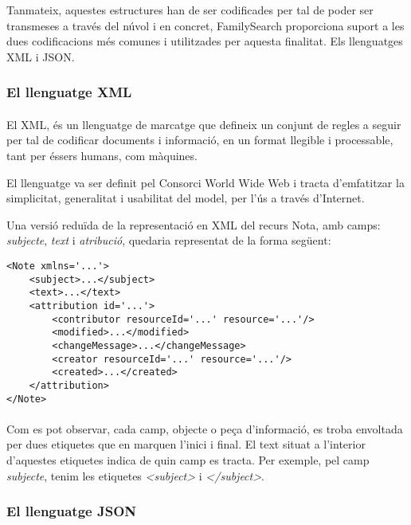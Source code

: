         Tanmateix, aquestes estructures han de ser codificades per tal de poder ser transmeses a través del núvol i en concret, FamilySearch proporciona suport a les dues codificacions més comunes i utilitzades per aquesta finalitat. Els llenguatges XML i JSON.


        \subsubsection{El llenguatge XML}

        \paragraph{}
        El \gls{XML}, és un llenguatge de marcatge que defineix un conjunt de regles a seguir per tal de codificar documents i informació, en un format llegible i processable, tant per éssers humans, com màquines.

        El llenguatge va ser definit pel Consorci World Wide Web i tracta d’emfatitzar la simplicitat, generalitat i usabilitat del model, per l'ús a través d'Internet.

        Una versió reduïda de la representació en XML del recurs Nota, amb camps: \emph{subjecte}, \emph{text} i \emph{atribució}, quedaria representat de la forma següent:

        \begin{lstlisting}[style=rawOwn,caption={Representació bàsica en XML d'una Nota}]
<Note xmlns='...'>
    <subject>...</subject>
    <text>...</text>
    <attribution id='...'>
        <contributor resourceId='...' resource='...'/>
        <modified>...</modified>
        <changeMessage>...</changeMessage>
        <creator resourceId='...' resource='...'/>
        <created>...</created>
    </attribution>
</Note>
        \end{lstlisting}

        \paragraph{}
        Com es pot observar, cada camp, objecte o peça d'informació, es troba envoltada per dues etiquetes que en marquen l'inici i final. El text situat a l'interior d'aquestes etiquetes indica de quin camp es tracta. Per exemple, pel camp \emph{subjecte}, tenim les etiquetes \emph{<subject>} i \emph{</subject>}.


        \subsubsection{El llenguatge JSON}


